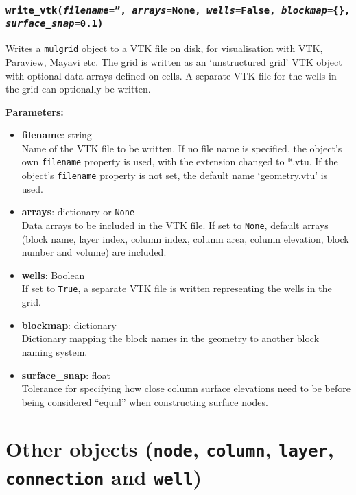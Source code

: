 \begin{snugshade}\subsubsection{\texttt{write\_vtk(\emph{filename}='', \emph{arrays}=None, \emph{wells}=False, \emph{blockmap}=\{\}, \\
      \emph{surface\_snap}=0.1)}}\end{snugshade}
\label{sec:mulgrid:write_vtk}

Writes a \texttt{mulgrid} object to a VTK file on disk, for visualisation with VTK, Paraview, Mayavi etc.  The grid is written as an `unstructured grid' VTK object with optional data arrays defined on cells.  A separate VTK file for the wells in the grid can optionally be written.

\textbf{Parameters:}
\begin{itemize}
\item \textbf{filename}: string\\
  Name of the VTK file to be written.  If no file name is specified, the object's own \texttt{filename} property is used, with the extension changed to *.vtu.  If the object's \texttt{filename} property is not set, the default name `geometry.vtu' is used.
\item \textbf{arrays}: dictionary or \texttt{None}\\
  Data arrays to be included in the VTK file.  If set to \texttt{None}, default arrays (block name, layer index, column index, column area, column elevation, block number and volume) are included.
\item \textbf{wells}: Boolean\\
  If set to \texttt{True}, a separate VTK file is written representing the wells in the grid.
\item \textbf{blockmap}: dictionary\\
  Dictionary mapping the block names in the geometry to another block naming system.
\item \textbf{surface\_snap}: float\\
  Tolerance for specifying how close column surface elevations need to be before being considered ``equal'' when constructing surface nodes.
\end{itemize}

\section{Other objects (\texttt{node}, \texttt{column}, \texttt{layer}, \texttt{connection} and \texttt{well})}
\label{other_mulgrid_objects}

